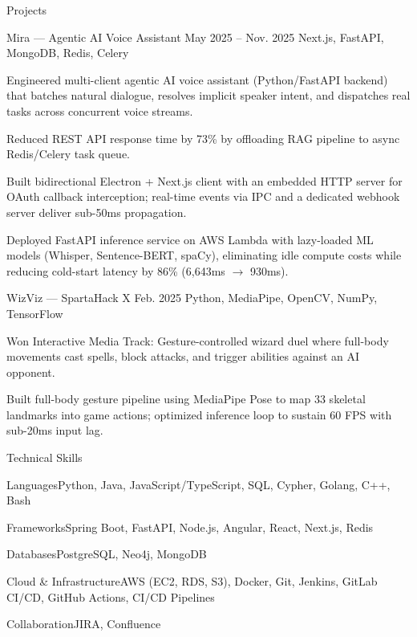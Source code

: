 \documentclass[
	11pt
]{../../../resume}
\begin{document}
	\begin{rSection}{P}{rojects}
		\begin{rSectionEntry}
			{Mira --- Agentic AI Voice Assistant}
			{May 2025 -- Nov. 2025}
			{}
			{Next.js, FastAPI, MongoDB, Redis, Celery}
			{}

			\item Engineered multi-client agentic AI voice assistant (Python/FastAPI backend) that batches natural dialogue, resolves implicit speaker intent, and dispatches real tasks across concurrent voice streams.
			\item Reduced REST API response time by 73\% by offloading RAG pipeline to async Redis/Celery task queue.
			\item Built bidirectional Electron + Next.js client with an embedded HTTP server for OAuth callback interception; real-time events via IPC and a dedicated webhook server deliver sub-50ms propagation.
			\item Deployed FastAPI inference service on AWS Lambda with lazy-loaded ML models (Whisper, Sentence-BERT, spaCy), eliminating idle compute costs while reducing cold-start latency by 86\% (6{,}643ms $\rightarrow$ 930ms).
		\end{rSectionEntry}

		\begin{rSectionEntry}
			{WizViz --- SpartaHack X}
			{Feb. 2025}
			{}
			{Python, MediaPipe, OpenCV, NumPy, TensorFlow}
			{}

			\item Won Interactive Media Track: Gesture-controlled wizard duel where full-body movements cast spells, block attacks, and trigger abilities against an AI opponent.
			\item Built full-body gesture pipeline using MediaPipe Pose to map 33 skeletal landmarks into game actions; optimized inference loop to sustain 60 FPS with sub-20ms input lag.
		\end{rSectionEntry}
	\end{rSection}

	\begin{rSection}{T}{echnical Skills}
		\begin{rSet}{Languages}{Python, Java, JavaScript/TypeScript, SQL, Cypher, Golang, C++, Bash}
		\end{rSet}
		\begin{rSet}{Frameworks}{Spring Boot, FastAPI, Node.js, Angular, React, Next.js, Redis}
		\end{rSet}
		\begin{rSet}{Databases}{PostgreSQL, Neo4j, MongoDB}
		\end{rSet}
		\begin{rSet}{Cloud \& Infrastructure}{AWS (EC2, RDS, S3), Docker, Git, Jenkins, GitLab CI/CD, GitHub Actions, CI/CD Pipelines}
		\end{rSet}
		\begin{rSet}{Collaboration}{JIRA, Confluence}
		\end{rSet}
	\end{rSection}
\end{document}
